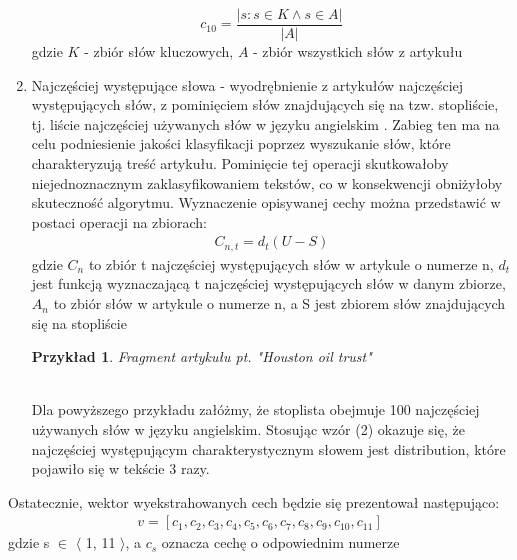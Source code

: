 \documentclass{classrep}
\newtheorem{exmp}{Przykład}[section]
\begin{document}
\begin{enumerate}
    \begin{equation}
        c_{10} = \frac{|{s: s \in K \land s \in A}|}{|A|}
    \end{equation}
    gdzie $K$ - zbiór słów kluczowych, $A$ - zbiór wszystkich słów z artykułu \\
    \item Najczęściej występujące słowa - wyodrębnienie z artykułów najczęściej występujących słów, z pominięciem słów znajdujących się na tzw. stopliście, tj. liście najczęściej używanych słów w języku angielskim \cite{coca_words}. Zabieg ten ma na celu podniesienie jakości klasyfikacji poprzez wyszukanie słów, które charakteryzują treść artykułu. Pominięcie tej operacji skutkowałoby niejednoznacznym zaklasyfikowaniem tekstów, co w konsekwencji obniżyłoby skuteczność algorytmu. 
	Wyznaczenie opisywanej cechy można przedstawić w postaci operacji na zbiorach:
	\begin{gather}
	C_{n, t}= d_{t}(U - S)
	\end{gather} 
	\indent gdzie $C_{n}$ to zbiór t najczęściej występujących słów w artykule o numerze n, 
	$d_{t}$ jest funkcją wyznaczającą t najczęściej występujących słów w danym zbiorze, $A_{n}$ to zbiór słów w artykule o numerze n, 
	a S jest zbiorem słów znajdujących się na stopliście \\
	\begin{exmp}
    Fragment artykułu pt. "Houston oil trust"  \cite{reuters} \\
     \\
    \end{exmp} 
    Dla powyższego przykładu załóżmy, że stoplista obejmuje 100 najczęściej używanych słów w języku angielskim. Stosując wzór (2) okazuje się, że najczęściej występującym charakterystycznym słowem jest distribution, które pojawiło się w tekście 3 razy. \\
\end{enumerate}
Ostatecznie, wektor wyekstrahowanych cech będzie się prezentował następująco: 
\begin{gather}
v = [c_{1}, c_{2}, c_{3}, c_{4}, c_{5}, c_{6}, c_{7}, c_{8}, c_{9}, c_{10}, c_{11}] 
\end{gather}
gdzie s $\in$ $\langle$ 1, 11 $\rangle$, a $c_{s}$ oznacza cechę o odpowiednim numerze 
\end{document}
